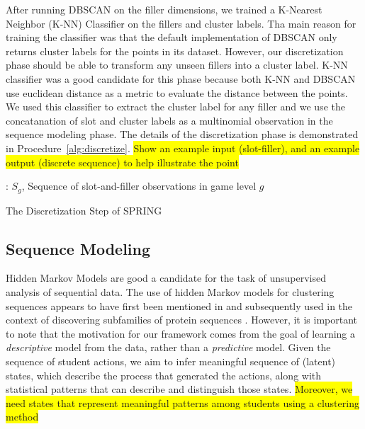 \documentclass{sigchi}
\newcommand{\hl}[1]{\colorbox{yellow}{#1}}
\def\algname{SPRING\xspace}
\begin{document}
After running DBSCAN on the filler dimensions, we trained a K-Nearest Neighbor (K-NN) Classifier on the fillers and cluster labels. 
Tha main reason for training the classifier was that the default implementation of DBSCAN only returns cluster labels for the points in its dataset. 
However, our discretization phase should be able to transform any unseen fillers into a cluster label. 
K-NN classifier was a good candidate for this phase because both K-NN and DBSCAN use euclidean distance as a metric to evaluate the distance between the points. 
We used this classifier to  extract the cluster label for any  filler and we use the concatanation of slot and cluster labels as a multinomial observation in the sequence modeling phase.
The details of the discretization phase is demonstrated in Procedure~\ref{alg:discretize}.
\hl{Show an example input (slot-filler), and an example output (discrete sequence) to help illustrate the point}

\begin{algorithm}
	\begin{algorithmic}[1]
		\Require: $S_g$, Sequence of slot-and-filler observations in game level $g$
		\EndIf
		\EndFor
		\EndFor
		\State
		\EndFor
		\State
		\EndFor
		\EndFor
		\State {}
		\EndProcedure
		
	\end{algorithmic}
	\caption{The Discretization Step of \algname \label{alg:discretize}}
\end{algorithm}



\subsection{Sequence Modeling}
Hidden Markov Models are good a candidate for the task of unsupervised analysis of sequential data.
The use of hidden Markov models for clustering sequences appears to have first been mentioned in \cite{juang1985probabilistic} and subsequently used in the context of discovering subfamilies of protein sequences \cite{krogh1994hidden}. 
However, it is important to note that the motivation for our framework comes from the goal of learning a \textit{descriptive} model from the data, rather than a \textit{predictive} model.
Given the sequence of student actions, we aim to infer meaningful sequence of (latent) states, which describe the process that generated the actions, along with statistical patterns that can describe and distinguish those states.
\hl{Moreover, we need states that represent meaningful patterns among students using a clustering method}
\end{document}
